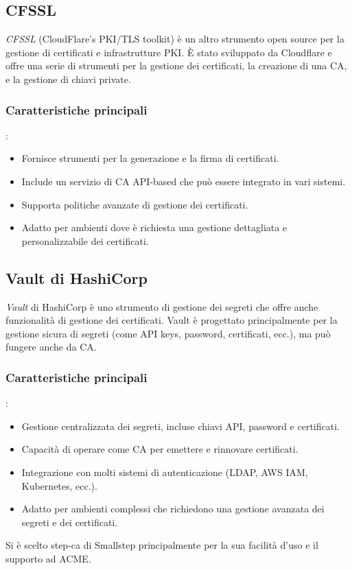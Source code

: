 \documentclass[12pt]{report}
\begin{document}
\subsection{CFSSL}
\textit{CFSSL} (CloudFlare's PKI/TLS toolkit) è un altro strumento open source per la gestione di certificati e infrastrutture PKI. È stato sviluppato da Cloudflare e offre una serie di strumenti per la gestione dei certificati, la creazione di una CA, e la gestione di chiavi private.

\subsubsection{Caratteristiche principali}:
\begin{itemize}
    \item Fornisce strumenti per la generazione e la firma di certificati.
    \item Include un servizio di CA API-based che può essere integrato in vari sistemi.
    \item Supporta politiche avanzate di gestione dei certificati.
    \item Adatto per ambienti dove è richiesta una gestione dettagliata e personalizzabile dei certificati.
\end{itemize}

\subsection{Vault di HashiCorp}
\textit{Vault} di HashiCorp è uno strumento di gestione dei segreti che offre anche funzionalità di gestione dei certificati. Vault è progettato principalmente per la gestione sicura di segreti (come API keys, password, certificati, ecc.), ma può fungere anche da CA.

\subsubsection{Caratteristiche principali}:
\begin{itemize}
    \item Gestione centralizzata dei segreti, incluse chiavi API, password e certificati.
    \item Capacità di operare come CA per emettere e rinnovare certificati.
    \item Integrazione con molti sistemi di autenticazione (LDAP, AWS IAM, Kubernetes, ecc.).
    \item Adatto per ambienti complessi che richiedono una gestione avanzata dei segreti e dei certificati.
\end{itemize}
Si è scelto step-ca di Smallstep principalmente per la sua facilità d'uso e il supporto ad ACME.
\end{document}
